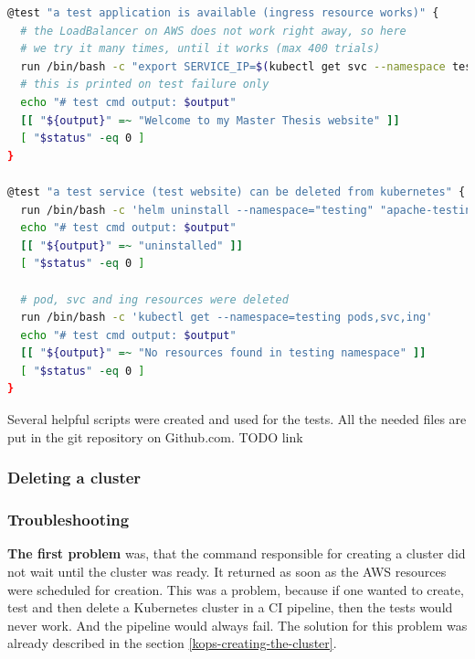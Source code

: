 \begin{lstlisting}[basicstyle=\tiny,caption={TODO},captionpos=b,language=Bash,xleftmargin=1cm]
@test "a test application is available (ingress resource works)" {
  # the LoadBalancer on AWS does not work right away, so here
  # we try it many times, until it works (max 400 trials)
  run /bin/bash -c "export SERVICE_IP=$(kubectl get svc --namespace testing apache-testing --template '{{ range (index .status.loadBalancer.ingress 0) }}{{.}}{{ end }}') && chmod +x test-timeout-until.sh && ./test-timeout-until.sh \"curl --max-time 2 -L http://\$SERVICE_IP 2>/dev/null | grep 'Welcome to my Master Thesis website'\" \"400\" \"curl --max-time 2 -L http://\$SERVICE_IP 2>/dev/null | grep 'Welcome to my Master Thesis website'\""
  # this is printed on test failure only
  echo "# test cmd output: $output"
  [[ "${output}" =~ "Welcome to my Master Thesis website" ]]
  [ "$status" -eq 0 ]
}

@test "a test service (test website) can be deleted from kubernetes" {
  run /bin/bash -c 'helm uninstall --namespace="testing" "apache-testing" && kubectl delete -f config-map-www-contents.yaml && kubectl delete namespace "testing"'
  echo "# test cmd output: $output"
  [[ "${output}" =~ "uninstalled" ]]
  [ "$status" -eq 0 ]

  # pod, svc and ing resources were deleted
  run /bin/bash -c 'kubectl get --namespace=testing pods,svc,ing'
  echo "# test cmd output: $output"
  [[ "${output}" =~ "No resources found in testing namespace" ]]
  [ "$status" -eq 0 ]
}
\end{lstlisting}
Several helpful scripts were created and used for the tests. All the needed files are put in the git repository on Github.com. TODO link



\subsubsection{Deleting a cluster}

\subsubsection{Troubleshooting}
\label{kops-troubleshooting}

\textbf{The first problem} was, that the command responsible for creating a cluster did not wait until the cluster was ready. It returned as soon as the AWS resources were scheduled for creation. This was a problem, because if one wanted to create, test and then delete a Kubernetes cluster in a CI pipeline, then the tests would never work. And the pipeline would always fail. The solution for this problem was already described in the section \ref{kops-creating-the-cluster}.

